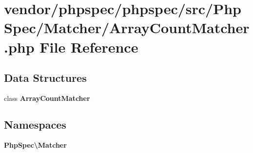 \section{vendor/phpspec/phpspec/src/\+Php\+Spec/\+Matcher/\+Array\+Count\+Matcher.php File Reference}
\label{_array_count_matcher_8php}
\subsection*{Data Structures}
\begin{DoxyCompactItemize}
\item 
class {\bf Array\+Count\+Matcher}
\end{DoxyCompactItemize}
\subsection*{Namespaces}
\begin{DoxyCompactItemize}
\item 
 {\bf Php\+Spec\textbackslash{}\+Matcher}
\end{DoxyCompactItemize}
